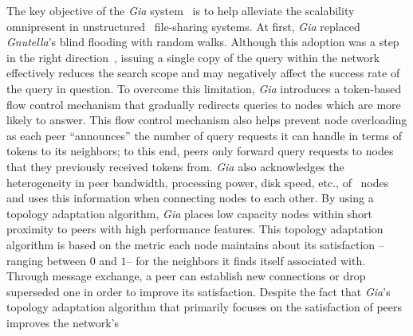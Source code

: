 The key objective of the {\sl Gia} system~\cite{CRBLS2003} is 
to help alleviate the scalability omnipresent
in unstructured \p\ file-sharing systems.
At first, {\sl Gia} replaced {\sl Gnutella}'s blind flooding 
with random walks.
Although this adoption was 
a step in the right direction~\cite{lv_randomwalks_2002},
issuing a single copy of the query within the network
effectively reduces the search scope and may negatively affect 
the success rate of the query in question.
To overcome this limitation, {\sl Gia} introduces
a token-based flow control mechanism
that gradually redirects queries to nodes which are more
likely to answer. 
This flow control mechanism also helps prevent node overloading
as each peer ``announces'' the number of query requests it 
can handle in terms of tokens to its neighbors; to this end, 
peers only forward query requests to nodes that they previously
received tokens from.
{\sl Gia} also acknowledges the heterogeneity in peer bandwidth,
processing power, disk speed, etc., of \p\ nodes and uses this
information when connecting nodes to each other.
By using a topology adaptation algorithm, 
{\sl Gia} places low capacity nodes within 
short proximity to peers with high performance features.
This topology adaptation algorithm is based on the metric 
each node maintains about its satisfaction --ranging between $0$ and $1$--
for the neighbors it finds itself associated with. 
Through message exchange, a peer can establish new connections 
or drop superseded one in order to improve its satisfaction.
Despite the fact that {\sl Gia}'s topology adaptation algorithm 
that primarily focuses on the satisfaction of peers improves the network's 

